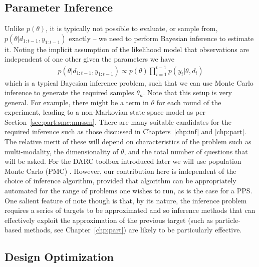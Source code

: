 \subsection{Parameter Inference}
\label{sec:design:auto:inf}

Unlike $p\left(\theta\right)$, it is typically not possible to evaluate, or sample from, $p\left(\theta | d_{1:t-1}, y_{1:t-1}\right)$ exactly -- we need to perform Bayesian inference to estimate it.  Noting
the implicit assumption of the likelihood model that observations are independent of one other given the
parameters we have
\begin{align}
p\left(\theta | d_{1:t-1}, y_{1:t-1}\right) \propto p(\theta) \prod_{i=1}^{t-1} p(y_i | \theta, d_i)
\end{align}
which is a typical Bayesian inference problem, such that we can use Monte Carlo inference
to generate the required samples $\theta_n$.  Note that this setup is very general.   For example, there might
be a term in $\theta$ for each round of the experiment, leading to a non-Markovian state space model as
per Section~\ref{sec:part:smc:nmssm}.
There are many suitable candidates for the required inference such as those discussed in Chapters~\ref{chp:inf} and
\ref{chp:part}.
The relative merit of these will depend on
characteristics of the problem such as multi-modality, the dimensionality of $\theta$, and the total
number of questions that will be asked.  For the DARC toolbox introduced later we will use 
population Monte Carlo (PMC) \citep{cappe2004population}.  However, our contribution here is independent of
the choice of inference algorithm, provided that algorithm can be appropriately automated for the range
of problems one wishes to run, as is the case for a PPS.  One salient feature of note though is
that, by its nature, the inference problem requires a series of targets to be approximated and so
inference methods that can effectively exploit the approximation of the previous target (such as particle-based methods, see
 Chapter~\ref{chp:part}) are likely to be particularly effective.

\subsection{Design Optimization}
\label{sec:design:auto:optimization}

